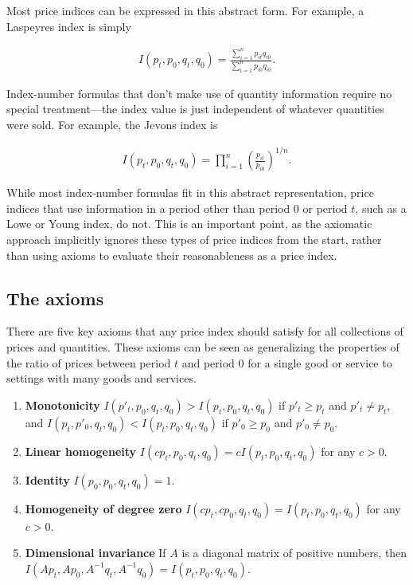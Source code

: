 \documentclass[]{article}
\begin{document}
Most price indices can be expressed in this abstract form. For example, a Laspeyres index is simply

\begin{align*}
I(p_{t}, p_{0}, q_{t}, q_{0}) = \frac{\sum_{i=1}^{n} p_{it}q_{i0}}{\sum_{i=1}^{n} p_{i0}q_{i0}}.
\end{align*}

Index-number formulas that don't make use of quantity information require no special treatment---the index value is just independent of whatever quantities were sold. For example, the Jevons index is

\begin{align*}
I(p_{t}, p_{0}, q_{t}, q_{0}) = \prod_{i=1}^{n} \left(\frac{p_{it}}{p_{i0}}\right)^{1 / n}.
\end{align*}

While most index-number formulas fit in this abstract representation, price indices that use information in a period other than period 0 or period \(t\), such as a Lowe or Young index, do not. This is an important point, as the axiomatic approach implicitly ignores these types of price indices from the start, rather than using axioms to evaluate their reasonableness as a price index.

\hypertarget{the-axioms}{%
\subsection{The axioms}\label{the-axioms}}

There are five key axioms that any price index should satisfy for all collections of prices and quantities. These axioms can be seen as generalizing the properties of the ratio of prices between period \(t\) and period 0 for a single good or service to settings with many goods and services.

\begin{enumerate}
\def\labelenumi{\arabic{enumi}.}
\item
  \textbf{Monotonicity} \(I(p'_{t}, p_{0}, q_{t}, q_{0}) > I(p_{t}, p_{0}, q_{t}, q_{0})\) if \(p'_{t} \geq p_{t}\) and \(p'_{t} \neq p_{t}\), and \(I(p_{t}, p'_{0}, q_{t}, q_{0}) < I(p_{t}, p_{0}, q_{t}, q_{0})\) if \(p'_{0} \geq p_{0}\) and \(p'_{0} \neq p_{0}\).
\item
  \textbf{Linear homogeneity} \(I(cp_{t}, p_{0}, q_{t}, q_{0}) = cI(p_{t}, p_{0}, q_{t}, q_{0})\) for any \(c > 0\).
\item
  \textbf{Identity} \(I(p_{0}, p_{0}, q_{t}, q_{0}) = 1\).
\item
  \textbf{Homogeneity of degree zero} \(I(cp_{t}, cp_{0}, q_{t}, q_{0}) = I(p_{t}, p_{0}, q_{t}, q_{0})\) for any \(c > 0\).
\item
  \textbf{Dimensional invariance} If \(A\) is a diagonal matrix of positive numbers, then \(I(Ap_{t}, Ap_{0}, A^{-1}q_{t}, A^{-1}q_{0}) = I(p_{t}, p_{0}, q_{t}, q_{0})\).
\end{enumerate}
\end{document}
